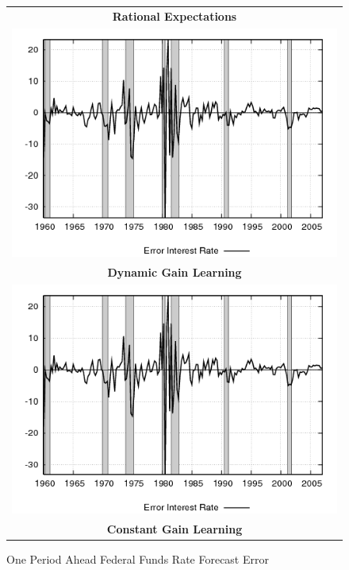 \documentclass[12pt]{article}
\begin{document}
\begin{figure}[ht]
\caption{One Period Ahead Federal Funds Rate Forecast Error}\label{fg:fedfundserr}
\begin{center}
\begin{tabular}{c}
\textbf{Rational Expectations} \\  
\includegraphics[scale=0.5]{results_re/fedfunds_err.png} \\
\textbf{Dynamic Gain Learning} \\
\includegraphics[scale=0.5]{results_dg8_wlsinit/fedfunds_err.png} \\
\textbf{Constant Gain Learning} \\

\end{tabular}
\end{center}
\end{figure}
\end{document}
